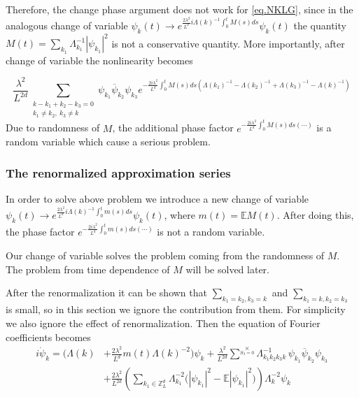 Therefore, the change phase argument does not work for \eqref{eq.NKLG}, since in the analogous change of variable $\psi_k(t)\rightarrow e^{\frac{2\lambda^2}{L^{d}} i \Lambda(k)^{-1}\int^t_{0}M(s) ds}  \psi_k(t)$ the quantity $M(t)=\sum_{k_1}\Lambda_{k_1}^{-1}|\psi_{k_1}|^2$ is not a conservative quantity. More importantly, after change of variable the nonlinearity becomes

\begin{equation}
\frac{\lambda^2}{L^{2d}} \sum\limits_{\substack{k - k_1 + k_2 -k_3 = 0 \\  k_1\ne k_2,\ k_3 \ne k}} \psi_{k_1}\overline{\psi}_{k_2}  \psi_{k_3} e^{- \frac{2i\lambda^2}{L^{d}} \int^t_{0}M(s) ds\left(\Lambda(k_1)^{-1}-\Lambda(k_2)^{-1}+\Lambda(k_3)^{-1}-\Lambda(k)^{-1}\right)} 
\end{equation}
Due to randomness of $M$, the additional phase factor $e^{- \frac{2i\lambda^2}{L^{d}} \int^t_{0}M(s) ds(\cdots)}$ is a random variable which cause a serious problem. 


\subsubsection{The renormalized approximation series} \label{sec.appsol}%


In order to solve above problem we introduce a new change of variable $\psi_k(t)\rightarrow e^{\frac{2\lambda^2}{L^{d}} i \Lambda(k)^{-1}\int^t_{0}m(s) ds}  \psi_k(t)$, where $m(t)=\mathbb{E}M(t)$. After doing this, the phase factor $e^{- \frac{2i\lambda^2}{L^{d}} \int^t_{0}m(s) ds(\cdots)}$ is not a random variable. 

Our change of variable solves the problem coming from the randomness of $M$. The problem from time dependence of $M$ will be solved later.

After the renormalization it can be shown that  $\sum_{k_1=k_2,k_3=k}$ and $\sum_{k_1=k,k_2=k_3}$ is small, so in this section we ignore the contribution from them. For simplicity we also ignore the effect of renormalization. Then the equation of Fourier coefficients becomes
\begin{equation}\label{eq.renormalizedintro}
    \begin{split}
    i \dot{\psi}_{k} 
    =  \bigg(\Lambda(k)&+\frac{2\lambda^2}{L^{d}} m(t)\Lambda(k)^{-2}\bigg) \psi_k
    +\frac{\lambda^2}{L^{2d}} \sum^{\times}\limits_{S_3=0}  \Lambda_{k_1k_2k_3k}^{-1}\,\psi_{k_1}\overline{\psi}_{k_2}  \psi_{k_3}
    \\
    &+\frac{2\lambda^2}{L^{2d}} \left(\sum\limits_{k_1\in \mathbb{Z}^d_L} \Lambda_{k_1}^{-2}\Big(|\psi_{k_1}|^2-\mathbb{E} |\psi_{k_1}|^2\Big) \right) \Lambda_{k}^{-2}\psi_{k}    
    \end{split}
    \end{equation}

